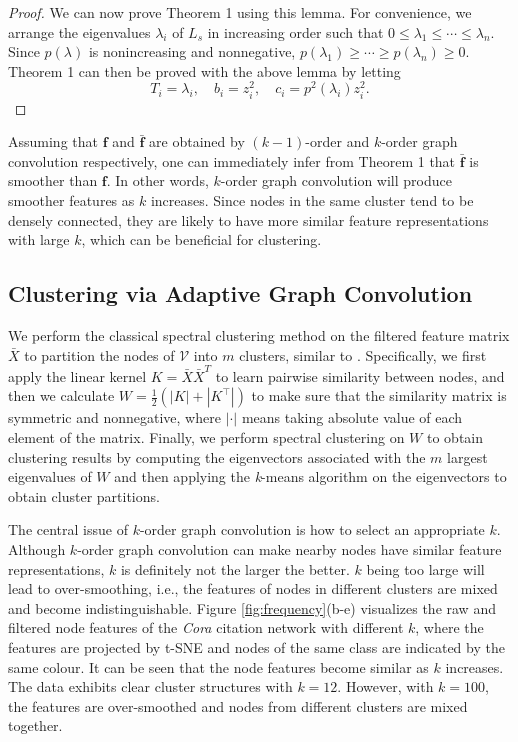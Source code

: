 \documentclass{article}
\begin{document}
\begin{proof}
    We can now prove Theorem 1 using this lemma. For convenience, we arrange the eigenvalues $\lambda_i$ of $L_s$ in increasing order such that $0\le\lambda_1\le\cdots\le\lambda_n$. Since $p(\lambda)$ is nonincreasing and nonnegative,  $p(\lambda_1)\ge\cdots\ge p(\lambda_n)\ge0$. Theorem 1 can then be proved with the above lemma by letting
    \begin{equation}
        T_i=\lambda_i,\quad b_i=z_i^2,\quad c_i=p^2(\lambda_i)z_i^2.
    \end{equation}
\end{proof}

Assuming that $\bm f$ and $\bar{\bm f}$ are obtained by $(k-1)$-order and $k$-order graph convolution respectively, one can immediately infer from Theorem 1 that $\bar{\bm f}$ is smoother than $\bm f$. In other words, $k$-order graph convolution will produce smoother features as $k$ increases. Since nodes in the same cluster tend to be densely connected, they are likely to have more similar feature representations with large $k$, which can be beneficial for clustering.


\subsection{Clustering via Adaptive Graph Convolution}

We perform the classical spectral clustering method \cite{perona1998,von2007tutorial} on the filtered feature matrix $\bar{X}$ to partition the nodes of $\mathcal{V}$ into $m$ clusters, similar to \cite{wang2017mgae}. Specifically, we first apply the linear kernel $K=\bar{X}\bar{X}^T$ to learn pairwise similarity between nodes, and then we calculate $W=\frac12(|K|+|K^\top|)$ to make sure that the similarity matrix is symmetric and nonnegative, where $|\cdot|$ means taking absolute value of each element of the matrix. Finally, we perform spectral clustering on $W$ to obtain clustering results by computing the eigenvectors associated with the $m$ largest eigenvalues of $W$ and then applying the \emph{k}-means algorithm on the eigenvectors to obtain cluster partitions.


The central issue of $k$-order graph convolution is how to select an appropriate $k$. Although $k$-order graph convolution can make nearby nodes have similar feature representations, $k$ is definitely not the larger the better. $k$ being too large will lead to over-smoothing, i.e., the features of nodes in different clusters are mixed and become indistinguishable. Figure \ref{fig:frequency}(b-e) visualizes the raw and filtered node features of the \emph{Cora} citation network with different $k$, where the features are projected by t-SNE \cite{van2008visualizing} and nodes of the same class are indicated by the same colour. It can be seen that the node features become similar as $k$ increases. The data exhibits clear cluster structures with $k=12$. However, with $k=100$, the features are over-smoothed and nodes from different clusters are mixed together.
\end{document}
